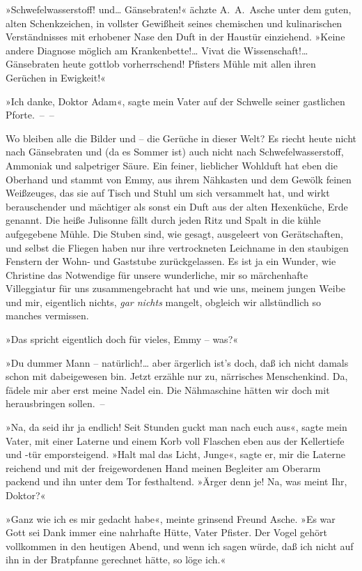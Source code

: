 »Schwefelwasserstoff! und\ldots{} Gänsebraten!« ächzte A.~A.~Asche unter
dem guten, alten Schenkzeichen, in vollster Gewißheit seines
chemischen und kulinarischen Verständnisses mit erhobener Nase den
Duft in der Haustür einziehend. »Keine andere Diagnose möglich am
Krankenbette!\ldots{} Vivat die Wissenschaft!\ldots{} Gänsebraten heute
gottlob vorherrschend! Pfisters Mühle mit allen ihren Gerüchen in
Ewigkeit!«

»Ich danke, Doktor Adam«, sagte mein Vater auf der Schwelle seiner
gastlichen Pforte.~–~–

Wo bleiben alle die Bilder und – die Gerüche in dieser Welt? Es
riecht heute nicht nach Gänsebraten und (da es Sommer ist) auch
nicht nach Schwefelwasserstoff, Ammoniak und salpetriger Säure. Ein
feiner, lieblicher Wohlduft hat eben die Oberhand und stammt von
Emmy, aus ihrem Nähkasten und dem Gewölk feinen Weißzeuges, das sie
auf Tisch und Stuhl um sich versammelt hat, und wirkt berauschender
und mächtiger als sonst ein Duft aus der alten Hexenküche, Erde
genannt. Die heiße Julisonne fällt durch jeden Ritz und Spalt in
die kühle aufgegebene Mühle. Die Stuben sind, wie gesagt,
ausgeleert von Gerätschaften, und selbst die Fliegen haben nur ihre
vertrockneten Leichname in den staubigen Fenstern der Wohn- und
Gaststube zurückgelassen. Es ist ja ein Wunder, wie Christine das
Notwendige für unsere wunderliche, mir so märchenhafte Villeggiatur
für uns zusammengebracht hat und wie uns, meinem jungen Weibe und
mir, eigentlich nichts, \emph{gar nichts} mangelt, obgleich wir
allstündlich so manches vermissen.

»Das spricht eigentlich doch für vieles, Emmy – was?«

»Du dummer Mann – natürlich!\ldots{} aber ärgerlich ist's doch, daß ich
nicht damals schon mit dabeigewesen bin. Jetzt erzähle nur zu,
närrisches Menschenkind. Da, fädele mir aber erst meine Nadel ein.
Die Nähmaschine hätten wir doch mit herausbringen sollen.~–

»Na, da seid ihr ja endlich! Seit Stunden guckt man nach euch aus«,
sagte mein Vater, mit einer Laterne und einem Korb voll Flaschen
eben aus der Kellertiefe und -tür emporsteigend. »Halt mal das
Licht, Junge«, sagte er, mir die Laterne reichend und mit der
freigewordenen Hand meinen Begleiter am Oberarm packend und ihn
unter dem Tor festhaltend. »Ärger denn je! Na, was meint Ihr,
Doktor?«

»Ganz wie ich es mir gedacht habe«, meinte grinsend Freund Asche.
»Es war Gott sei Dank immer eine nahrhafte Hütte, Vater Pfister.
Der Vogel gehört vollkommen in den heutigen Abend, und wenn ich
sagen würde, daß ich nicht auf ihn in der Bratpfanne gerechnet
hätte, so löge ich.«

